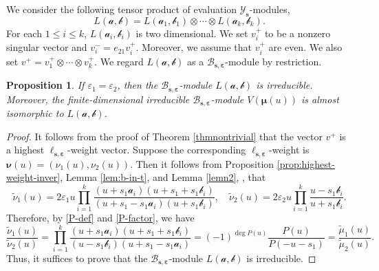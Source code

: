 \documentclass[11pt,reqno]{amsart}
\numberwithin{equation}{section}
\newtheorem{prop}[thm]{Proposition}
\theoremstyle{definition}
\theoremstyle{remark}
\newcommand{\mc}{\mathcal}
\newcommand{\tl}{\tilde}
\newcommand{\lle}{\leqslant}
\newcommand{\YMN}{{\mathscr{Y}_{\bm s}}}
\newcommand{\BMN}{{\mathscr{B}_{\bm s,\bm \ve}}}
\newcommand{\ve}{\varepsilon}
\newcommand{\s}{{\bm s}}
\begin{document}
We consider the following tensor product of evaluation $\YMN$-modules,
\[
L(\bm{\mc a,\mc b})=L(\mc a_1,\mc b_1)\otimes \cdots\otimes L(\mc a_k,\mc b_k).
\]
For each $1\lle i\lle k$, $L(\mc a_i,\mc b_i)$ is two dimensional. We set $v_i^+$ to be a nonzero singular vector and $v_i^-=e_{21}v_i^+$. Moreover, we assume that $v_i^+$ are even. We also set $v^+=v_1^+\otimes\cdots\otimes v_k^+$. We regard $L(\bm{\mc a,\mc b})$ as a $\BMN$-module by restriction.
\begin{prop}\label{prop=}
If $\ve_1=\ve_2$, then the  $\BMN$-module $L(\bm{\mc a,\mc b})$ is irreducible. Moreover, the finite-dimensional irreducible $\BMN$-module $V(\bm\mu(u))$ is almost isomorphic to $L(\bm{\mc a,\mc b})$.
\end{prop}
\begin{proof}
It follows from the proof of Theorem \ref{thmnontrivial} that the vector $v^+$ is a highest $\ell_{\s,\bm\ve}$-weight vector. Suppose the corresponding $\ell_{\s,\bm\ve}$-weight is $\bm\nu(u)=(\nu_1(u),\nu_2(u))$. Then it follows from Proposition \ref{prop:highest-weight-inver}, Lemma \ref{lem:b-in-t}, and Lemma \ref{lemn2}, , that
\[
\tl \nu_1(u)=2\ve_1u\prod_{i=1}^k\frac{(u+s_1\mc a_i)(u+s_1+s_1\mc b_i)}{(u+s_1-s_1\mc a_i)(u+s_1\mc b_i)},\quad \tl \nu_2(u) = 2\ve_2u\prod_{i=1}^k\frac{u-s_1\mc b_i}{u+s_1\mc b_i}.
\]
Therefore, by \eqref{P-def} and \eqref{P-factor}, we have
\[
\frac{\tl \nu_1(u)}{\tl \nu_2(u)}=\prod_{i=1}^k\frac{(u+s_1\mc a_i)(u+s_1+s_1\mc b_i)}{(u-s_1\mc b_i)(u+s_1-s_1\mc a_i)}=(-1)^{\deg P(u)}\frac{P(u)}{P(-u-s_1)}=\frac{\tl \mu_1(u)}{\tl \mu_2(u)}.
\]
Thus, it suffices to prove that the  $\BMN$-module $L(\bm{\mc a,\mc b})$ is irreducible.


\end{proof}
\end{document}
